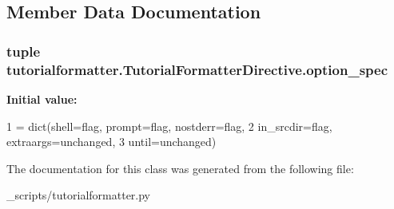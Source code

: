 \subsection{Member Data Documentation}
\subsubsection[{option\-\_\-spec}]{\setlength{\rightskip}{0pt plus 5cm}tuple tutorialformatter.\-Tutorial\-Formatter\-Directive.\-option\-\_\-spec\hspace{0.3cm}{\ttfamily [static]}}\label{classtutorialformatter_1_1_tutorial_formatter_directive_a7bbf9985e8df9db8766f93b4ed82f4c4}
{\bfseries Initial value\-:}
\begin{DoxyCode}
1 = dict(shell=flag, prompt=flag, nostderr=flag,
2                        in\_srcdir=flag, extraargs=unchanged,
3                        until=unchanged)
\end{DoxyCode}


The documentation for this class was generated from the following file\-:\begin{DoxyCompactItemize}
\item 
\-\_\-scripts/tutorialformatter.\-py\end{DoxyCompactItemize}
